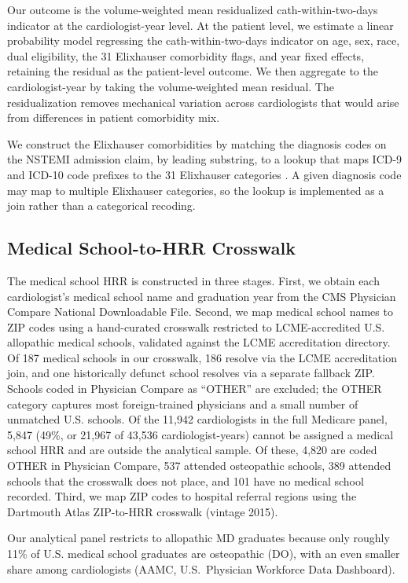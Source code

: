 \documentclass[12pt]{article}
\begin{document}
Our outcome is the volume-weighted mean residualized cath-within-two-days indicator at the cardiologist-year level. At the patient level, we estimate a linear probability model regressing the cath-within-two-days indicator on age, sex, race, dual eligibility, the 31 Elixhauser comorbidity flags, and year fixed effects, retaining the residual as the patient-level outcome. We then aggregate to the cardiologist-year by taking the volume-weighted mean residual. The residualization removes mechanical variation across cardiologists that would arise from differences in patient comorbidity mix.

We construct the Elixhauser comorbidities by matching the diagnosis codes on the NSTEMI admission claim, by leading substring, to a lookup that maps ICD-9 and ICD-10 code prefixes to the 31 Elixhauser categories \citep{quan2005}. A given diagnosis code may map to multiple Elixhauser categories, so the lookup is implemented as a join rather than a categorical recoding.

\subsection{Medical School-to-HRR Crosswalk}

The medical school HRR is constructed in three stages. First, we obtain each cardiologist's medical school name and graduation year from the CMS Physician Compare National Downloadable File. Second, we map medical school names to ZIP codes using a hand-curated crosswalk restricted to LCME-accredited U.S. allopathic medical schools, validated against the LCME accreditation directory. Of 187 medical schools in our crosswalk, 186 resolve via the LCME accreditation join, and one historically defunct school resolves via a separate fallback ZIP. Schools coded in Physician Compare as ``OTHER'' are excluded; the OTHER category captures most foreign-trained physicians and a small number of unmatched U.S. schools. Of the 11,942 cardiologists in the full Medicare panel, 5,847 (49\%, or 21,967 of 43,536 cardiologist-years) cannot be assigned a medical school HRR and are outside the analytical sample. Of these, 4,820 are coded OTHER in Physician Compare, 537 attended osteopathic schools, 389 attended schools that the crosswalk does not place, and 101 have no medical school recorded. Third, we map ZIP codes to hospital referral regions using the Dartmouth Atlas ZIP-to-HRR crosswalk (vintage 2015).

Our analytical panel restricts to allopathic MD graduates because only roughly 11\% of U.S. medical school graduates are osteopathic (DO), with an even smaller share among cardiologists (AAMC, U.S.\ Physician Workforce Data Dashboard).
\end{document}
